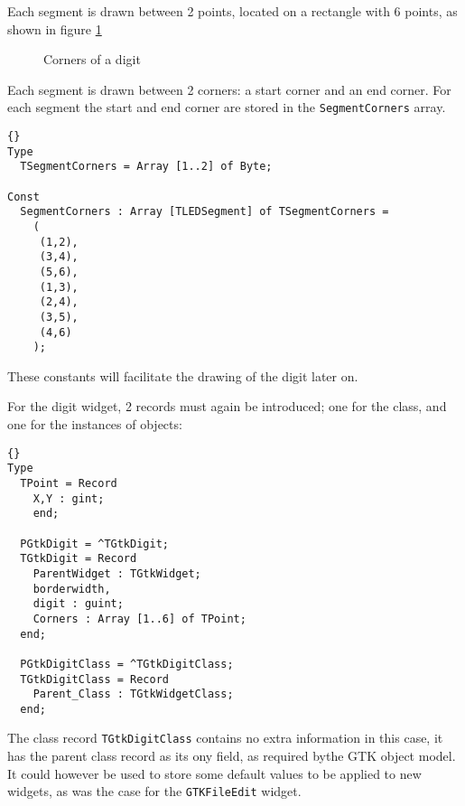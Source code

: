 \documentclass[10pt]{article}
\begin{document}
Each segment is drawn between 2 points, located on a rectangle
with 6 points, as shown in figure \ref{fig:corners}
\begin{figure}
\begin{center}
\caption{Corners of a digit}\label{fig:corners}
\end{center}
\end{figure}
Each segment is drawn between 2 corners: a start corner and an end corner.
For each segment the start and end corner are stored in the 
\lstinline|SegmentCorners| array.
\begin{lstlisting}{}
Type
  TSegmentCorners = Array [1..2] of Byte;

Const
  SegmentCorners : Array [TLEDSegment] of TSegmentCorners = 
    (
     (1,2),
     (3,4),
     (5,6),
     (1,3),
     (2,4),
     (3,5),
     (4,6)
    );
\end{lstlisting}
These constants will facilitate the drawing of the digit later on. 

For the digit widget, 2 records must again be introduced; one for the class,
and one for the instances of objects:
\begin{lstlisting}{}
Type
  TPoint = Record 
    X,Y : gint;
    end;

  PGtkDigit = ^TGtkDigit;  
  TGtkDigit = Record 
    ParentWidget : TGtkWidget;
    borderwidth,
    digit : guint;
    Corners : Array [1..6] of TPoint;
  end;
  
  PGtkDigitClass = ^TGtkDigitClass;
  TGtkDigitClass = Record
    Parent_Class : TGtkWidgetClass;
  end;
\end{lstlisting}
The class record \lstinline|TGtkDigitClass| contains no extra information
in this case, it has the parent class record as its ony field, as required 
bythe GTK object model. It could however be used to store some default values to 
be applied to new widgets, as was the case for the \lstinline|GTKFileEdit|
widget.
\end{document}
